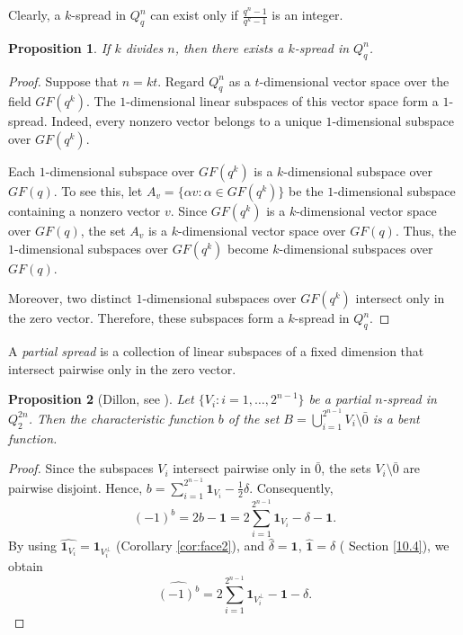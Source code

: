 \documentclass[11pt]{article}
\newtheorem{claim}{Proposition}[section]
\theoremstyle{definition}
\begin{document}
{{{Clearly, a $k$-spread in $Q_q^n$ can exist only if
$\frac{q^n-1}{q^k-1}$
is an integer.

\begin{claim}
If $k$ divides $n$, then there exists a $k$-spread in $Q_q^n$.
\end{claim}

\begin{proof}
Suppose that $n=kt$. Regard $Q_q^n$ as a $t$-dimensional vector space over the field $GF(q^k)$. The $1$-dimensional linear subspaces of this vector space form a $1$-spread. Indeed, every nonzero vector belongs to a unique $1$-dimensional subspace over $GF(q^k)$.

Each $1$-dimensional subspace over $GF(q^k)$ is a $k$-dimensional subspace over $GF(q)$. To see this, let
$
A_v=\{\alpha v:\alpha\in GF(q^k)\}
$
be the $1$-dimensional subspace containing a nonzero vector $v$. Since $GF(q^k)$ is a $k$-dimensional vector space over $GF(q)$, the set $A_v$ is a $k$-dimensional vector space over $GF(q)$. Thus, the $1$-dimensional subspaces over $GF(q^k)$ become $k$-dimensional subspaces over $GF(q)$.

Moreover, two distinct $1$-dimensional subspaces over $GF(q^k)$ intersect only in the zero vector. Therefore, these subspaces form a $k$-spread in $Q_q^n$.
\end{proof}

A {\sl partial spread} is a collection of linear subspaces of a fixed dimension that intersect pairwise only in the zero vector.

\begin{claim}[Dillon, see \cite{Mesnager}]\label{Dillon}
Let
$
\{V_i:i=1,\dots,2^{n-1}\}
$
be a partial $n$-spread in $Q_2^{2n}$. Then the characteristic function $b$ of the set
$B=\bigcup_{i=1}^{2^{n-1}}V_i\setminus{\bar 0}$
is a bent function.
\end{claim}

\begin{proof}
Since the subspaces $V_i$ intersect pairwise only in $\bar 0$, the sets $V_i\setminus{\bar 0}$ are pairwise disjoint. Hence,
$b=\sum_{i=1}^{2^{n-1}}{\mathbf 1}_{V_i}-\frac12\delta$. Consequently,
$$(-1)^b= 2b-{\mathbf 1}=
2\sum_{i=1}^{2^{n-1}}{\mathbf 1}_{V_i}-\delta-\mathbf 1.
$$
By using 
$
\widehat{{\mathbf 1}_{V_i}}={\mathbf 1}_{V_i^\perp}$ (Corollary \ref {cor:face2}),
and  
$
\widehat{\delta}=\mathbf 1$, $\widehat{\mathbf 1}=\delta$ ( Section \ref{10.4}),
we obtain
$$\widehat{(-1)^b}=
2\sum_{i=1}^{2^{n-1}}{\mathbf 1}_{V_i^\perp}
-\mathbf 1-\delta.
$$


\end{proof}}}}
\end{document}
